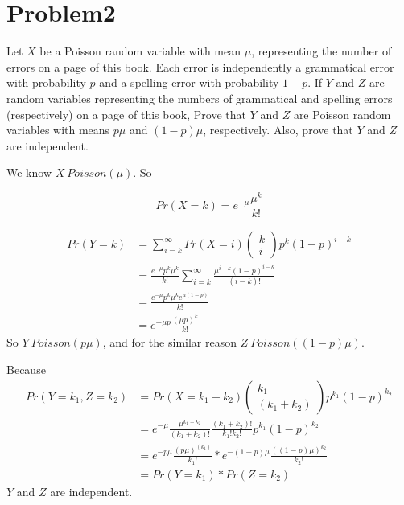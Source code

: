 \documentclass[12pt]{article}
\begin{document}
\section{Problem2}
Let $X$ be a Poisson random variable with mean $\mu$, representing the number of errors on a
page of this book. Each error is independently a grammatical error with probability $p$ and
a spelling error with probability $1-p$. If $Y$ and $Z$ are random variables representing the
numbers of grammatical and spelling errors (respectively) on a page of this book, Prove
that $Y$ and $Z$ are Poisson random variables with means $p\mu$ and $(1-p)\mu$, respectively.
Also, prove that $Y$ and $Z$ are independent.

We know $X ~ Poisson(\mu)$. So

\begin{equation}
    Pr(X=k) = e^{-\mu} \frac{\mu^k}{k!}
\end{equation}

\begin{equation}
    \begin{split}
    Pr(Y=k) &= \sum_{i=k}^{\infty} Pr(X=i) \left( \begin{array}{l} k\\i\end{array} \right) p^k (1-p)^{i-k} \\
    &= \frac{e^{-\mu} p^k \mu^k}{k!} \sum_{i=k}^{\infty} \frac{\mu^{i-k}(1-p)^{i-k}}{(i-k)!} \\
    &= \frac{e^{-\mu} p^k \mu^k e^{\mu(1-p)}}{k!} \\
    &= e^{-\mu p}\frac{(\mu p)^k}{k!}
    \end{split}
\end{equation}
So $Y ~ Poisson(p\mu)$, and for the similar reason $Z ~ Poisson((1-p)\mu)$.

Because
\begin{equation}
    \begin{split}
    Pr(Y=k_1, Z=k_2) &= Pr(X=k_1+k_2) \left( \begin{array}{l} k_1\\(k_1+k_2)\end{array} \right) p^{k_1} (1-p)^{k_2} \\
    &= e^{-\mu} \frac{\mu^{k_1+k_2}}{(k_1+k_2)!} \frac{(k_1+k_2)!}{k_1! k_2!} p^{k_1} (1-p)^{k_2}\\
    &= e^{-p\mu} \frac{(p\mu)^(k_1)}{k_1!} * e^{-(1-p)\mu} \frac{((1-p)\mu)^{k_2}}{k_2!} \\
    &= Pr(Y=k_1) * Pr(Z=k_2)
    \end{split}
\end{equation}
$Y$ and $Z$ are independent.
\end{document}
